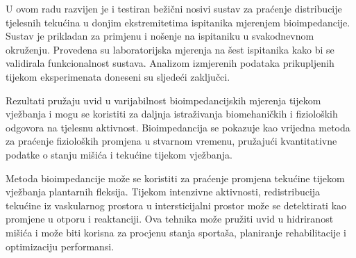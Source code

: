 \documentclass[../diplomski_rad.tex]{subfiles}
\begin{document}
\sloppy

\justifying

U ovom radu razvijen je i testiran bežični nosivi sustav za praćenje distribucije tjelesnih tekućina u donjim ekstremitetima
ispitanika mjerenjem bioimpedancije. Sustav je prikladan za primjenu i nošenje na ispitaniku u svakodnevnom okruženju. Provedena su laboratorijska mjerenja na šest ispitanika kako bi se validirala funkcionalnost sustava. 
Analizom izmjerenih podataka prikupljenih tijekom eksperimenata doneseni su sljedeći zaključci.

Rezultati pružaju uvid u varijabilnost bioimpedancijskih mjerenja tijekom vježbanja i mogu se 
koristiti za daljnja istraživanja biomehaničkih i fizioloških odgovora na tjelesnu aktivnost. 
Bioimpedancija se pokazuje kao vrijedna metoda za praćenje fizioloških promjena u stvarnom vremenu, 
pružajući kvantitativne podatke o stanju mišića i tekućine tijekom vježbanja.

Metoda bioimpedancije može se koristiti za praćenje promjena tekućine tijekom vježbanja plantarnih fleksija. 
Tijekom intenzivne aktivnosti, redistribucija tekućine iz vaskularnog prostora u intersticijalni prostor 
može se detektirati kao promjene u otporu i reaktanciji. 
Ova tehnika može pružiti uvid u hidriranost mišića i može biti korisna za procjenu stanja sportaša, 
planiranje rehabilitacije i optimizaciju performansi.
\end{document}
